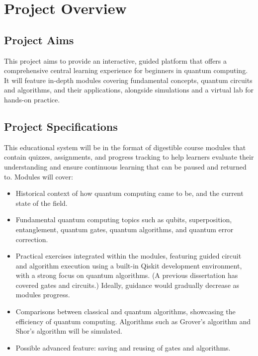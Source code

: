 \chapter{Project Overview}
\label{chap:Key_Contributions}

\section{Project Aims}

This project aims to provide an interactive, guided platform that offers a comprehensive central learning experience for beginners in quantum computing. It will feature in-depth modules covering fundamental concepts, quantum circuits and algorithms, and their applications, alongside simulations and a virtual lab for hands-on practice.

\section{Project Specifications}
This educational system will be in the format of digestible course modules that contain quizzes,  assignments, and progress tracking to help learners evaluate their understanding and ensure continuous learning that can be paused and returned to. Modules will cover: 
\begin{itemize}
    \item Historical context of how quantum computing came to be, and the current state of the field.
    \item Fundamental quantum computing topics such as qubits, superposition, entanglement, quantum gates, quantum algorithms, and quantum error correction. 
    \item Practical exercises integrated within the modules, featuring guided circuit and algorithm execution using a built-in Qiskit development environment, with a strong focus on quantum algorithms. (A previous dissertation has covered gates and circuits.) Ideally, guidance would gradually decrease as modules progress. 
    \item Comparisons between classical and quantum algorithms, showcasing the efficiency of quantum computing. Algorithms such as Grover’s algorithm and Shor’s algorithm will be simulated.
    \item Possible advanced feature: saving and reusing of gates and algorithms. 
\end{itemize}

